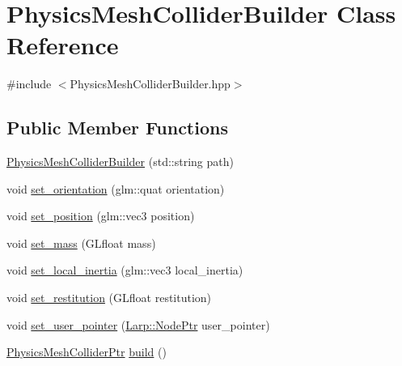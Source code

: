 \hypertarget{classPhysicsMeshColliderBuilder}{}\section{Physics\+Mesh\+Collider\+Builder Class Reference}
\label{classPhysicsMeshColliderBuilder}


{\ttfamily \#include $<$Physics\+Mesh\+Collider\+Builder.\+hpp$>$}

\subsection*{Public Member Functions}
\begin{DoxyCompactItemize}
\item 
\hyperlink{classPhysicsMeshColliderBuilder_a952bf520c1027f8e0eb5578a5cd25b89}{Physics\+Mesh\+Collider\+Builder} (std\+::string path)
\item 
void \hyperlink{classPhysicsMeshColliderBuilder_a7d0c5bfaf8e0bca011ee311ed4c36fc9}{set\+\_\+orientation} (glm\+::quat orientation)
\item 
void \hyperlink{classPhysicsMeshColliderBuilder_aaf6db772b22a11411492b3f43fc95f88}{set\+\_\+position} (glm\+::vec3 position)
\item 
void \hyperlink{classPhysicsMeshColliderBuilder_a011838ad8805502d286182e8017fe3a7}{set\+\_\+mass} (G\+Lfloat mass)
\item 
void \hyperlink{classPhysicsMeshColliderBuilder_a37138f70dbc02843fa06a661f8624439}{set\+\_\+local\+\_\+inertia} (glm\+::vec3 local\+\_\+inertia)
\item 
void \hyperlink{classPhysicsMeshColliderBuilder_a8262d206da5afc9aa1f60471a0c37f1c}{set\+\_\+restitution} (G\+Lfloat restitution)
\item 
void \hyperlink{classPhysicsMeshColliderBuilder_a1c85c9d22611d1b78ef867e04b3bcc07}{set\+\_\+user\+\_\+pointer} (\hyperlink{namespaceLarp_a171c1dc8b70cfb441b15d7386780db23}{Larp\+::\+Node\+Ptr} user\+\_\+pointer)
\item 
\hyperlink{PhysicsMeshCollider_8hpp_a60e5aab5f281e1dc60a635fae2466a6e}{Physics\+Mesh\+Collider\+Ptr} \hyperlink{classPhysicsMeshColliderBuilder_a3136483052f4740f1bb544b212f78cc2}{build} ()
\end{DoxyCompactItemize}
